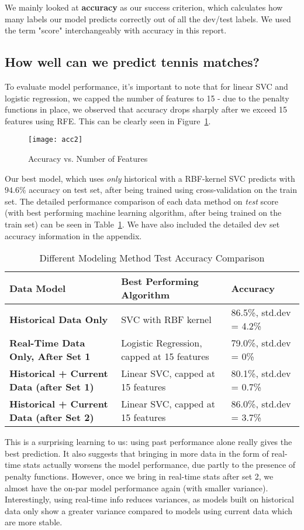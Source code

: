 \documentclass[paper=a4, fontsize=10pt]{scrartcl} %
\numberwithin{equation}{section} %
\numberwithin{figure}{section} %
\numberwithin{table}{section} %
\begin{document}
We mainly looked at \textbf{accuracy} as our success criterion, which calculates how many labels our model predicts correctly out of all the dev/test labels.  We used the term "score" interchangeably with accuracy in this report. 
\subsection{How well can we predict tennis matches?}
To evaluate model performance, it's important to note that for linear SVC and logistic regression, we capped the number of features to 15 - due to the penalty functions in place, we observed that accuracy drops sharply after we exceed 15 features using RFE. This can be clearly seen in Figure~\ref{fig:rfe}. 
\begin{figure}[h]
\caption{Accuracy vs. Number of Features}
  \label{fig:rfe}
  \centering
    \texttt{[image: acc2]}
\end{figure}
Our best model, which uses \textit{only} historical with a RBF-kernel SVC predicts with $94.6\%$ accuracy on test set, after being trained using cross-validation on the train set. The detailed performance comparison of each data method on \textit{test} score (with best performing machine learning algorithm, after being trained on the train set) can be seen in Table~\ref{tab:m1}. We have also included the detailed dev set accuracy information in the appendix. 
\begin{table}[h]
\caption{Different Modeling Method Test Accuracy Comparison}
\label{tab:m1}
\begin{tabular}{ p{2.5cm} | p{2.5cm} | p{2cm}}
    \hline
    \textbf{Data Model} & \textbf{Best Performing Algorithm} & \textbf{Accuracy}  \\ \hline
   \textbf{Historical Data Only} &  SVC with RBF kernel & 86.5\%, std.dev = 4.2\%  \\ \hline
   \textbf{Real-Time Data Only, After Set 1} & Logistic Regression, capped at 15 features & 79.0\%, std.dev = 0\%  \\ \hline
   \textbf{Historical + Current Data (after Set 1)} &  Linear SVC, capped at 15 features & 80.1\%, std.dev = 0.7\%  \\ \hline
   \textbf{Historical + Current Data (after Set 2)} &  Linear SVC, capped at 15 features & 86.0\%, std.dev = 3.7\% \\ \hline
\end{tabular}
\end{table}
This is a surprising learning to us: using past performance alone really gives the best prediction. It also suggests that bringing in more data in the form of real-time stats actually worsens the model performance, due partly to the presence of penalty functions. However, once we bring in real-time stats after set 2, we almost have the on-par model performance again (with smaller variance). Interestingly, using real-time info reduces variances, as models built on historical data only show a greater variance compared to models using current data which are  more stable. 
\end{document}
